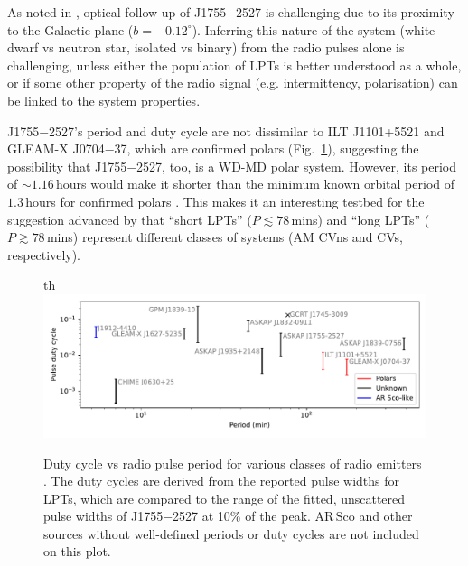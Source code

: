\documentclass[fleqn,usenatbib]{mnras}
\newcommand{\src}{J1755$-$2527}
\newcommand{\Fig}{Fig.}
\begin{document}
As noted in , optical follow-up of \src{} is challenging due to its proximity to the Galactic plane ($b = -0.12^\circ$).
Inferring this nature of the system (white dwarf vs neutron star, isolated vs binary) from the radio pulses alone is challenging, unless either the population of LPTs is better understood as a whole, or if some other property of the radio signal (e.g. intermittency, polarisation) can be linked to the system properties.

\src{}'s period and duty cycle are not dissimilar to ILT J1101+5521 and GLEAM-X J0704$-$37, which are confirmed polars (\Fig~\ref{fig:lpt_comparison}), suggesting the possibility that \src{}, too, is a WD-MD polar system.
However, its period of ${\sim}1.16\,$hours would make it shorter than the minimum known orbital period of $1.3\,$hours for confirmed polars \citep{schwope2025polarcatcatalogpolarslowaccretion}.
This makes it an interesting testbed for the suggestion advanced by \citet{2025arXiv250103315R} that ``short LPTs'' ($P \lesssim 78\,$mins) and ``long LPTs'' ($P \gtrsim 78\,$mins) represent different classes of systems (AM CVns and CVs, respectively).
\begin{figure}{th}
    \centering
    \includegraphics[width=0.98\linewidth]{lpt_comparison.pdf}
    \caption{Duty cycle vs radio pulse period for various classes of radio emitters \citep{2024arXiv240707480D,2022Natur.601..526H,2023Natur.619..487H,2024NatAs...8.1159C,2005Natur.434...50H,2024arXiv240811536D,Lee2025}. The duty cycles are derived from the reported pulse widths for LPTs, which are compared to the range of the fitted, unscattered pulse widths of \src{} at 10\% of the peak. AR\,Sco \citep{2016Natur.537..374M,2018A&A...611A..66S} and other sources without well-defined periods or duty cycles \citep[e.g.][and references therein]{2021ApJ...920...45W} are not included on this plot.}
    \label{fig:lpt_comparison}
\end{figure}
\end{document}
